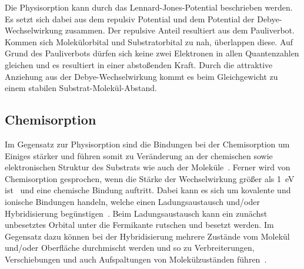             Die Physisorption kann durch das Lennard-Jones-Potential beschrieben werden.
            Es setzt sich dabei aus dem repulsiv Potential und dem Potential der Debye-Wechselwirkung zusammen.
            Der repulsive Anteil resultiert aus dem Pauliverbot. 
            Kommen sich Molekülorbital und Substratorbital zu nah, überlappen diese.
            Auf Grund des Pauliverbots dürfen sich keine zwei Elektronen in allen Quantenzahlen gleichen und es resultiert in einer abstoßenden Kraft.
            Durch die attraktive Anziehung aus der Debye-Wechselwirkung kommt es beim Gleichgewicht zu einem stabilen Substrat-Molekül-Abstand.
        
        \subsection{Chemisorption}
            Im Gegensatz zur Physisorption sind die Bindungen bei der Chemisorption um Einiges stärker und führen somit zu Veränderung an der chemischen sowie elektronischen Struktur des Substrats wie auch der Moleküle~\cite{bergenti_spinterface_2019}.
            Ferner wird von Chemisorption gesprochen, wenn die Stärke der Wechselwirkung größer als \SI{1}{\electronvolt} ist~\cite{muscat_chemisorption_1978} und eine chemische Bindung auftritt.
            Dabei kann es sich um kovalente und ionische Bindungen handeln, welche einen Ladungsaustausch und/oder Hybridisierung begünstigen~\cite{harutyunyan_hybridisation_2013}.
            Beim Ladungsaustausch kann ein zunächst unbesetztes Orbital unter die Fermikante rutschen und besetzt werden.
            Im Gegensatz dazu können bei der Hybridisierung mehrere Zustände vom Molekül und/oder Oberfläche durchmischt werden und so zu Verbreiterungen, Verschiebungen und auch Aufspaltungen von Molekülzuständen führen~\cite{IF_1}.

